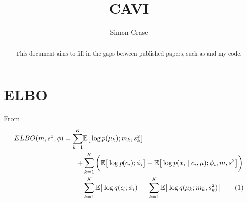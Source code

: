 \documentclass[]{article}
\title{CAVI}
\author{Simon Crase}
\newcommand{\Expectation}{\mathbb{E}}
\newcommand\numberthis{\addtocounter{equation}{1}\tag{\theequation}}
\begin{document}
\maketitle

\begin{abstract}
This document aims to fill in the gaps between published papers, such as \cite{blei2017variational} and my code.
\end{abstract}

\tableofcontents
\section{ELBO}
From \cite{blei2017variational}
\begin{align*}
	ELBO(m,s^2,\phi) = \sum_{k=1}^{K}& \Expectation \big[ \log {p(\mu_k);m_k,s_k^2}\big]\\
	+& \sum_{k=1}^{K}\bigg(\Expectation\big[\log{p(c_i);\phi_i}\big] + \Expectation\big[\log{p(x_i\mid c_i,\mu);\phi_i,m,s^2}\big]\bigg)\\
	-& \sum_{k=1}^K\Expectation\big[\log{q(c_i;\phi_i)}\big] - \sum_{k=1}^K\Expectation \big[\log{q(\mu_k;m_k,s^2_k)}\big] \numberthis \label{eq:ELBO}
\end{align*}




\end{document}

